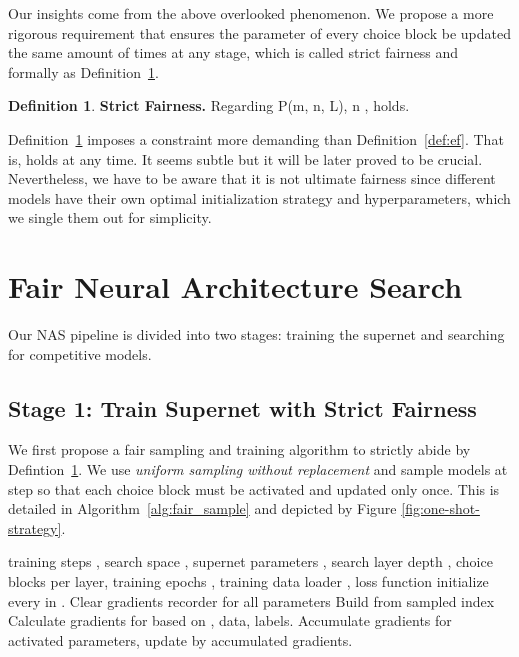 \documentclass[10pt,twocolumn,letterpaper]{article}
\theoremstyle{definition}
\newtheorem{definition}{Definition}[section]
\begin{document}
Our insights come from the above overlooked phenomenon. We propose a more rigorous requirement that ensures the parameter of every choice block be updated the same amount of times at any stage, which is called strict fairness and formally as Definition~\ref{def:sf}.

\begin{definition}
	\label{def:sf}
	\textbf{Strict Fairness.} Regarding P(m, n, L),  n   ,  holds.
\end{definition}
Definition~\ref{def:sf} imposes a constraint more demanding than Definition~\ref{def:ef}. That is,  holds at any time. It seems subtle but it will be later proved to be crucial. Nevertheless, we have to be aware that it is not ultimate fairness since different models have their own optimal initialization strategy and hyperparameters, which we single them out for simplicity.  

\section{Fair Neural Architecture Search}

Our NAS pipeline is divided into two stages: training the supernet and searching for competitive models.

\subsection{Stage 1: Train Supernet with Strict Fairness}
We first propose a fair sampling and training algorithm to strictly abide by Defintion~\ref{def:sf}.  We use \emph{uniform sampling without replacement} and sample  models at step  so that each choice block must be activated and updated only once. This is detailed in Algorithm~\ref{alg:fair_sample} and depicted by Figure \ref{fig:one-shot-strategy}. 

\begin{algorithm}
	\caption{\textbf{: Stage 1} - Fair Supernet Training.}
	\label{alg:fair_sample}
	\begin{algorithmic}
		 training steps , search space ,  supernet parameters , search layer depth , choice blocks  per layer, training epochs , training data loader , loss function 
		\STATE initialize  every  in  .
		\ENDFOR
		\STATE  Clear gradients recorder for all parameters
		\STATE  
		\STATE Build  from sampled index
		\STATE Calculate gradients for  based on , data, labels.
		\STATE Accumulate gradients for activated parameters, 
		\ENDFOR
		\STATE update  by accumulated gradients. 
		\ENDFOR
		\ENDFOR
	\end{algorithmic}
\end{algorithm} 
\end{document}
